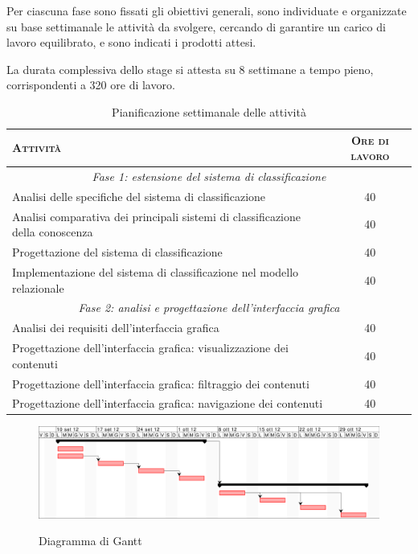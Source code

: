 \documentclass[11pt,a4paper,headsepline,hidelinks]{scrreprt} %
\begin{document}
	Per ciascuna fase sono fissati gli obiettivi generali, sono individuate e organizzate su base settimanale le attività da svolgere, cercando di garantire un carico di lavoro equilibrato, e sono indicati i prodotti attesi.
	
  La durata complessiva dello stage si attesta su 8 settimane a tempo pieno, corrispondenti a 320 ore di lavoro.
	
	\begin{table}[ht]
	\centering
	\begin{tabular}{|p{10cm}|c|}
	\hline
	\textsc{Attività} & \textsc{Ore di lavoro} \\ \hline
	\multicolumn{2}{|c|}{\textit{Fase 1: estensione del sistema di classificazione}} \\ \hline 
	Analisi delle specifiche del sistema di classificazione & 40 \\ \hline
	Analisi comparativa dei principali sistemi di classificazione della conoscenza & 40 \\ \hline
	Progettazione del sistema di classificazione & 40 \\ \hline
	Implementazione del sistema di classificazione nel modello relazionale & 40 \\ \hline
	\multicolumn{2}{|c|}{\textit{Fase 2: analisi e progettazione dell'interfaccia grafica}} \\ \hline 
	Analisi dei requisiti dell'interfaccia grafica & 40 \\ \hline
	Progettazione dell'interfaccia grafica: visualizzazione dei contenuti & 40 \\ \hline
	Progettazione dell'interfaccia grafica: filtraggio dei contenuti & 40 \\ \hline
	Progettazione dell'interfaccia grafica: navigazione dei contenuti & 40 \\ \hline
	\end{tabular}
	\caption{Pianificazione settimanale delle attività}
	\label{tab:tesi:stage:pianificazione}
	\end{table}
	
	\begin{figure}[ht]
	\begin{center}
    	\includegraphics[width=14.5cm]{gantt.png}
		\label{fig:tesi:stage:gantt}
		\caption{Diagramma di Gantt}
	\end{center}
	\end{figure}
\end{document}
